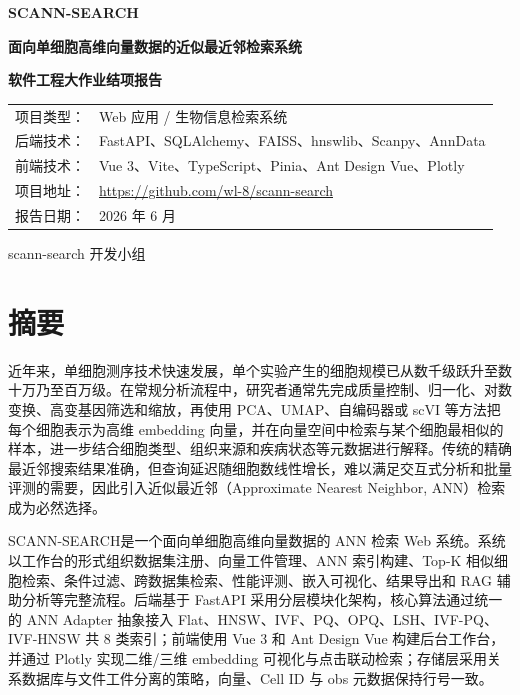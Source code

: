 \documentclass[UTF8,a4paper,12pt]{ctexrep}
\newcommand{\project}{SCANN-SEARCH}
\begin{document}
\begin{titlepage}
  \centering
  \vspace*{1.8cm}
  {\bfseries \project\par}
  \vspace{0.6cm}
  {\bfseries 面向单细胞高维向量数据的近似最近邻检索系统\par}
  \vspace{0.8cm}
  {\bfseries 软件工程大作业结项报告\par}
  \vspace{1.6cm}
  \begin{tabular}{rl}
    项目类型： & Web 应用 / 生物信息检索系统 \\
    后端技术： & FastAPI、SQLAlchemy、FAISS、hnswlib、Scanpy、AnnData \\
    前端技术： & Vue 3、Vite、TypeScript、Pinia、Ant Design Vue、Plotly \\
    项目地址： & \url{https://github.com/wl-8/scann-search} \\
    报告日期： & 2026 年 6 月 \\
  \end{tabular}
  \vfill
  {\large scann-search 开发小组\par}
\end{titlepage}

\chapter*{摘要}

近年来，单细胞测序技术快速发展，单个实验产生的细胞规模已从数千级跃升至数十万乃至百万级。在常规分析流程中，研究者通常先完成质量控制、归一化、对数变换、高变基因筛选和缩放，再使用 PCA、UMAP、自编码器或 scVI 等方法把每个细胞表示为高维 embedding 向量，并在向量空间中检索与某个细胞最相似的样本，进一步结合细胞类型、组织来源和疾病状态等元数据进行解释。传统的精确最近邻搜索结果准确，但查询延迟随细胞数线性增长，难以满足交互式分析和批量评测的需要，因此引入近似最近邻（Approximate Nearest Neighbor, ANN）检索成为必然选择。

\project 是一个面向单细胞高维向量数据的 ANN 检索 Web 系统。系统以工作台的形式组织数据集注册、向量工件管理、ANN 索引构建、Top-K 相似细胞检索、条件过滤、跨数据集检索、性能评测、嵌入可视化、结果导出和 RAG 辅助分析等完整流程。后端基于 FastAPI 采用分层模块化架构，核心算法通过统一的 ANN Adapter 抽象接入 Flat、HNSW、IVF、PQ、OPQ、LSH、IVF-PQ、IVF-HNSW 共 8 类索引；前端使用 Vue 3 和 Ant Design Vue 构建后台工作台，并通过 Plotly 实现二维/三维 embedding 可视化与点击联动检索；存储层采用关系数据库与文件工件分离的策略，向量、Cell ID 与 obs 元数据保持行号一致。
\end{document}
